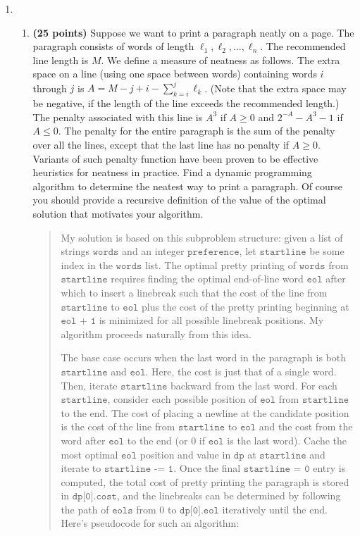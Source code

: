 \documentclass[11pt]{article}
\newcommand{\code}[1]{$\texttt{#1}$}
\begin{document}
\begin{enumerate}
\item
\begin{enumerate}
\item
{\bf (25 points)}
Suppose we want to print a paragraph neatly on a page. The
paragraph consists of words of length $\ell_1,\ell_2,\ldots,\ell_n$.
The recommended line length is $M$. We
define a measure of neatness as follows. The extra space on a line
(using one space between words) containing words $i$ through
$j$  is $A = M-j+i-\sum_{k=i}^j \ell_k$. (Note that the extra space may be negative, if the length of the line exceeds the recommended length.) The penalty associated with this line
is $A^3$ if $A \geq 0$ and $2^{-A}-A^3-1$ if $A \leq 0$. The penalty for the entire paragraph
is the sum of the penalty over all the lines, except that the last line has no penalty if $A \ge 0$. 
Variants of such penalty function have been proven to be effective
heuristics for neatness in practice. Find a dynamic programming
algorithm to determine the neatest way to print a paragraph. Of
course you should provide a recursive definition of the value of the
optimal solution that motivates your algorithm.

\begin{quote}
  \color{purple}
  My solution is based on this subproblem structure: given a list of strings \code{words} and an integer \code{preference}, let \code{startline} be some index in the \code{words} list. The optimal pretty printing of \code{words} from \code{startline} requires finding the optimal end-of-line word \code{eol} after which to insert a linebreak such that the cost of the line from \code{startline} to \code{eol} plus the cost of the pretty printing beginning at \code{eol + 1} is minimized for all possible linebreak positions. My algorithm proceeds naturally from this idea.

\medskip
The base case occurs when the last word in the paragraph is both \code{startline} and \code{eol}. Here, the cost is just that of a single word. Then, iterate \code{startline} backward from the last word. For each \code{startline}, consider each possible position of \code{eol} from \code{startline} to the end. The cost of placing a newline at the candidate position is the cost of the line from \code{startline} to \code{eol} and the cost from the word after \code{eol} to the end (or $0$ if \code{eol} is the last word). Cache the most optimal \code{eol} position and value in \code{dp} at \code{startline} and iterate to \code{startline -= 1}. Once the final \code{startline = 0} entry is computed, the total cost of pretty printing the paragraph is stored in \code{dp[0].cost}, and the linebreaks can be determined by following the path of \code{eols} from $0$ to \code{dp[0].eol} iteratively until the end. Here's pseudocode for such an algorithm:


\end{quote}
\end{enumerate}
\end{enumerate}
\end{document}
